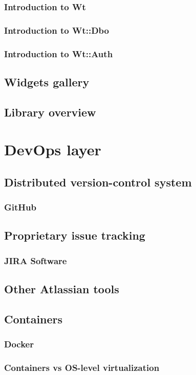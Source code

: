 \documentclass[a4paper,12pt]{article}
\begin{document}
{\subsubsection{Introduction to Wt}
\subsubsection{Introduction to Wt::Dbo}
\subsubsection{Introduction to Wt::Auth}
\subsection{Widgets gallery}
\subsection{Library overview}

\section{DevOps layer}
\subsection{Distributed version-control system}}
\subsubsection{GitHub}
\subsection{Proprietary issue tracking}
\subsubsection{JIRA Software}
\subsection{Other Atlassian tools}
\subsection{Containers}
\subsubsection{Docker}
\subsubsection{Containers vs OS-level virtualization}
\end{document}
